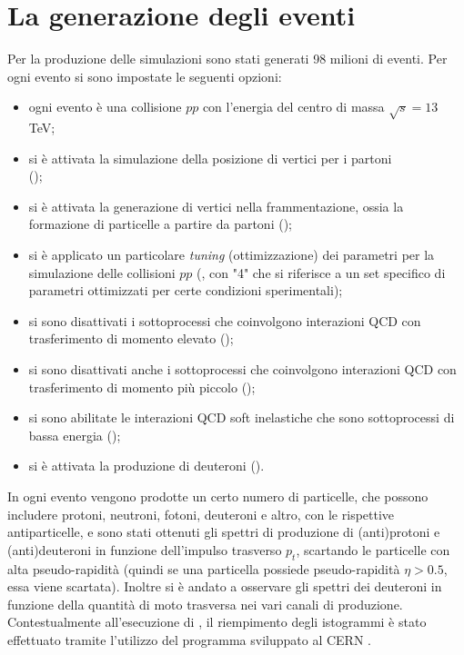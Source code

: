 \section{La generazione degli eventi}\label{ch:settings}
Per la produzione delle simulazioni sono stati generati 98 milioni di eventi.
Per ogni evento si sono impostate le seguenti opzioni:
\begin{itemize}
    \item ogni evento è una collisione $pp$ con l'energia del centro di massa $\sqrt{s} = 13$ TeV;
    \item si è attivata la simulazione della posizione di vertici per i partoni \\ ();
    \item si è attivata la generazione di vertici nella frammentazione, ossia la formazione di particelle a partire da partoni ();
    \item si è applicato un particolare \textit{tuning} (ottimizzazione) dei parametri per la simulazione delle collisioni $pp$ (, con "4" che si riferisce a un set specifico di parametri ottimizzati per certe condizioni sperimentali);
    \item si sono disattivati i sottoprocessi che coinvolgono interazioni QCD con trasferimento di momento elevato ();
    \item si sono disattivati anche i sottoprocessi che coinvolgono interazioni QCD con trasferimento di momento più piccolo ();
    \item si sono abilitate le interazioni QCD soft inelastiche che sono sottoprocessi di bassa energia ();
    \item si è attivata la produzione di deuteroni ().
\end{itemize}
In ogni evento vengono prodotte un certo numero di particelle, che possono includere protoni, neutroni, fotoni, deuteroni e altro, con le rispettive antiparticelle, e sono stati ottenuti gli spettri di produzione di (anti)protoni e (anti)deuteroni in funzione dell'impulso trasverso $p_t$, scartando le particelle con alta pseudo-rapidità (quindi se una particella possiede pseudo-rapidità $\eta > 0.5$, essa viene scartata).
Inoltre si è andato a osservare gli spettri dei deuteroni in funzione della quantità di moto trasversa nei vari canali di produzione.
Contestualmente all'esecuzione di \pythiaa{}, il riempimento degli istogrammi è stato effettuato tramite l'utilizzo del programma  sviluppato al CERN \cite{fons_rademakers_2020_3895855}.